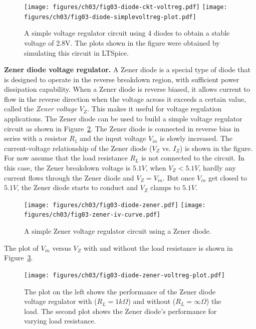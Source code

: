 \begin{figure}[htbp]
    \centering
    \texttt{[image: figures/ch03/fig03-diode-ckt-voltreg.pdf]}
    \hspace{1em} %
    \texttt{[image: figures/ch03/fig03-diode-simplevoltreg-plot.pdf]}
    \caption{A simple voltage regulator circuit using 4 diodes to obtain a stable voltage of 2.8V. The plots shown in the figure were obtained by simulating this circuit in LTSpice.}
    \label{fig:03-diode-voltreg1}
\end{figure}

\noindent\textbf{Zener diode voltage regulator.} A Zener diode is a special type of diode that is designed to operate in the reverse breakdown region, with sufficient power dissipation capability. When a Zener diode is reverse biased, it allows current to flow in the reverse direction when the voltage across it exceeds a certain value, called the \textit{Zener voltage} $V_Z$. This makes it useful for voltage regulation applications. The Zener diode can be used to build a simple voltage regulator circuit as shown in Figure~\ref{fig:03-diode-voltreg2}. The Zener diode is connected in reverse bias in series with a resistor $R_1$ and the input voltage $V_{in}$ is slowly increased.  The current-voltage relationship of the Zener diode ($V_Z$ vs. $I_Z$) is shown in the figure. For now assume that the load resistance $R_L$ is not connected to the circuit. In this case, the Zener breakdown voltage is $5.1V$, when $V_Z < 5.1V$, hardly any current flows through the Zener diode and $V_Z = V_{in}$. But once $V_{in}$ get closed to $5.1V$, the Zener diode starts to conduct and $V_Z$ clamps to $5.1V$.

\begin{figure}[htbp]
    \centering
    \texttt{[image: figures/ch03/fig03-diode-zener.pdf]}
    \hspace{1em} %
    \texttt{[image: figures/ch03/fig03-zener-iv-curve.pdf]}
    \caption{A simple Zener voltage regulator circuit using a Zener diode.}
    \label{fig:03-diode-voltreg2}
\end{figure}

The plot of $V_{in}$ versus $V_Z$ with and without the load resistance is shown in Figure~\ref{fig:03-diode-zener-voltreg-plot}.

\begin{figure}[htbp]
    \centering
    \texttt{[image: figures/ch03/fig03-diode-zener-voltreg-plot.pdf]}
    \caption{The plot on the left shows the performance of the Zener diode voltage regulator with ($R_L = 1k\Omega$) and without ($R_L = \infty \Omega$) the load. The second plot shows the Zener diode's performance for varying load resistance.}
    \label{fig:03-diode-zener-voltreg-plot}
\end{figure}

